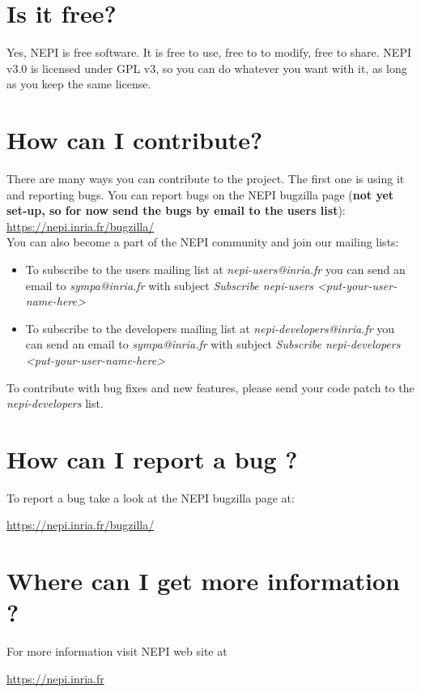 \section{Is it free?}

Yes, NEPI is free software. It is free to use, free to to modify, free to share.
NEPI v3.0 is licensed under GPL v3, so you can do whatever you want with it, 
as long as you keep the same license. 

\section{How can I contribute?}

There are many ways you can contribute to the project. 
The first one is using it and reporting bugs. 
You can report bugs on the NEPI bugzilla page 
(\textbf{not yet set-up, so for now send the bugs by email to the users list}): \\

\url{https://nepi.inria.fr/bugzilla/} \\

You can also become a part of the NEPI community and join our mailing lists:

\begin{itemize}
    \item To subscribe to the users mailing list at \textit{nepi-users@inria.fr}
        you can send an email to \textit{sympa@inria.fr} with subject
        \textit{Subscribe nepi-users <put-your-user-name-here>}
    \item To subscribe to the developers mailing list at \textit{nepi-developers@inria.fr}
        you can send an email to \textit{sympa@inria.fr} with subject
        \textit{Subscribe nepi-developers <put-your-user-name-here>}
    \end{itemize}

To contribute with bug fixes and new features, please send your code patch
to the \textit{nepi-developers} list.

\section{How can I report a bug ?}

To report a bug take a look at the NEPI bugzilla page at:

\url{https://nepi.inria.fr/bugzilla/} \\

\section{Where can I get more information ?}

For more information visit NEPI web site at

\url{https://nepi.inria.fr} \\


